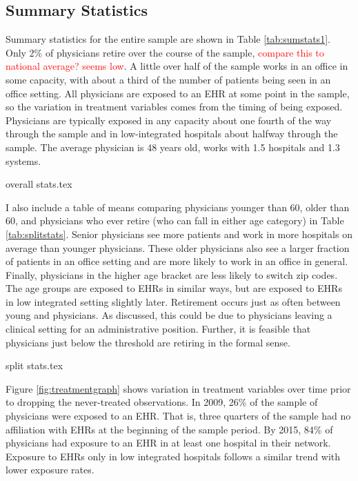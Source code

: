 \documentclass[11pt]{article}
\begin{document}
\subsection{Summary Statistics}

Summary statistics for the entire sample are shown in Table \ref{tab:sumstats1}. Only 2\% of physicians retire over the course of the sample, \textcolor{red}{compare this to national average? seems low}. A little over half of the sample works in an office in some capacity, with about a third of the number of patients being seen in an office setting. All physicians are exposed to an EHR at some point in the sample, so the variation in treatment variables comes from the timing of being exposed. Physicians are typically exposed in any capacity about one fourth of the way through the sample and in low-integrated hospitals about halfway through the sample. The average physician is 48 years old, works with 1.5 hospitals and 1.3 systems. 


{overall stats.tex}


I also include a table of means comparing physicians younger than 60, older than 60, and physicians who ever retire (who can fall in either age category) in Table \ref{tab:splitstats}. Senior physicians see more patients and work in more hospitals on average than younger physicians. These older physicians also see a larger fraction of patients in an office setting and are more likely to work in an office in general. Finally, physicians in the higher age bracket are less likely to switch zip codes. The age groups are exposed to EHRs in similar ways, but are exposed to EHRs in low integrated setting slightly later. Retirement occurs just as often between young and physicians. As discussed, this could be due to physicians leaving a clinical setting for an administrative position. Further, it is feasible that physicians just below the threshold are retiring in the formal sense. 

{split stats.tex}


Figure \ref{fig:treatmentgraph} shows variation in treatment variables over time prior to dropping the never-treated observations. In 2009, 26\% of the sample of physicians were exposed to an EHR. That is, three quarters of the sample had no affiliation with EHRs at the beginning of the sample period. By 2015, 84\% of physicians had exposure to an EHR in at least one hospital in their network. Exposure to EHRs only in low integrated hospitals follows a similar trend with lower exposure rates. 
\end{document}
